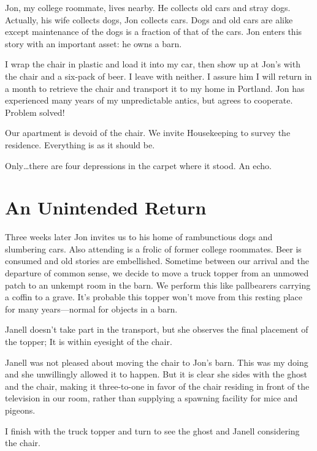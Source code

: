 \documentclass[
  letterpaper,
  DIV=11,
  numbers=noendperiod]{scrreprt}
\begin{document}
Jon, my college roommate, lives nearby. He collects old cars and stray
dogs. Actually, his wife collects dogs, Jon collects cars. Dogs and old
cars are alike except maintenance of the dogs is a fraction of that of
the cars. Jon enters this story with an important asset: he owns a barn.

I wrap the chair in plastic and load it into my car, then show up at
Jon's with the chair and a six-pack of beer. I leave with neither. I
assure him I will return in a month to retrieve the chair and transport
it to my home in Portland. Jon has experienced many years of my
unpredictable antics, but agrees to cooperate. Problem solved!

Our apartment is devoid of the chair. We invite Housekeeping to survey
the residence. Everything is as it should be.

Only\ldots there are four depressions in the carpet where it stood. An
echo.

\section*{An Unintended Return}\label{an-unintended-return}


Three weeks later Jon invites us to his home of rambunctious dogs and
slumbering cars. Also attending is a frolic of former college roommates.
Beer is consumed and old stories are embellished. Sometime between our
arrival and the departure of common sense, we decide to move a truck
topper from an unmowed patch to an unkempt room in the barn. We perform
this like pallbearers carrying a coffin to a grave. It's probable this
topper won't move from this resting place for many years---normal for
objects in a barn.

Janell doesn't take part in the transport, but she observes the final
placement of the topper; It is within eyesight of the chair.

Janell was not pleased about moving the chair to Jon's barn. This was my
doing and she unwillingly allowed it to happen. But it is clear she
sides with the ghost and the chair, making it three-to-one in favor of
the chair residing in front of the television in our room, rather than
supplying a spawning facility for mice and pigeons.

I finish with the truck topper and turn to see the ghost and Janell
considering the chair.
\end{document}
